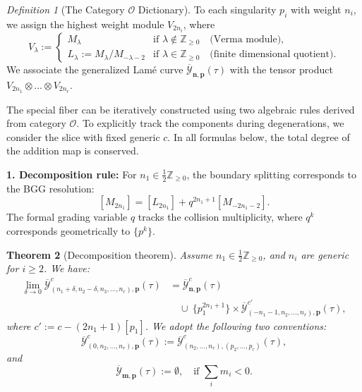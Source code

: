 \documentclass[11pt]{amsart}
\newtheorem{theorem}{Theorem}[section]
\theoremstyle{remark}
\newtheorem{definition}[theorem]{Definition}
\numberwithin{equation}{section}
\begin{document}
\begin{definition}[The Category $\mathcal{O}$ Dictionary] \label{def:BGG}
To each singularity $p_i$ with weight $n_i$, we assign the highest weight module $V_{2n_i}$, where
\[
    V_{\lambda} :=
    \begin{cases}
        M_{\lambda} & \text{if } \lambda \notin \mathbb{Z}_{\geq 0} \quad \text{(Verma module)}, \\
        L_{\lambda} := M_{\lambda}/M_{-\lambda-2} & \text{if } \lambda \in \mathbb{Z}_{\geq 0} \quad \text{(finite dimensional quotient)}.
    \end{cases}
\]
We associate the generalized Lam\'e curve $\overline{\mathcal{Y}}_{\mathbf{n},\mathbf{p}}(\tau)$ with the tensor product $V_{2n_1} \otimes \dots \otimes V_{2n_r}$. 
\end{definition}

The special fiber can be iteratively constructed using two algebraic rules derived from category $\mathcal{O}$. To explicitly track the components during degenerations, we consider the slice with fixed generic $c$. In all formulas below, the total degree of the addition map is conserved.

\vspace{0.5em}
\noindent \textbf{1. Decomposition rule:} For $n_1 \in \frac{1}{2}\mathbb{Z}_{\geq 0}$, the boundary splitting corresponds to the BGG resolution:
\[
    [M_{2n_1}] = [L_{2n_1}] + q^{2n_1+1} [M_{-2n_1-2}].
\]
The formal grading variable $q$ tracks the collision multiplicity, where $q^k$ corresponds geometrically to $\{p^k\}$.
\begin{theorem}[Decomposition theorem] \label{thm_decom} 
Assume $n_1 \in \tfrac{1}{2}\mathbb{Z}_{\geq 0}$, and $n_i$ are generic for $i \ge 2$. We have:
\[  
\begin{split}
    \lim_{\delta \rightarrow 0}\overline{\mathcal{Y}}_{(n_1+\delta,n_2-\delta,n_3,\dots,n_r),\mathbf{p} }^c(\tau) &= \overline{\mathcal{Y}}_{\mathbf{n},\mathbf{p} }^c(\tau) \\
    &\quad \cup \ \{p_1^{2n_1+1}\} \times \overline{\mathcal{Y}}^{c'}_{(-n_1-1,n_2,\dots,n_r),\mathbf{p}} (\tau),
\end{split}
\]
where $c' := c - (2n_1+1) [p_1]$. We adopt the following two conventions:
\[
    \overline{\mathcal{Y}}_{(0,n_2,\dots,n_r), \mathbf{p}}^c(\tau) 
    := \overline{\mathcal{Y}}_{(n_2,\dots,n_r), (p_2,\dots,p_r)}^c(\tau),
\]
and
\[
    \overline{\mathcal{Y}}_{\mathbf{m},\mathbf{p}}(\tau) := \emptyset, \quad \text{if } \sum_i m_i < 0.
\]
\end{theorem}
\end{document}
